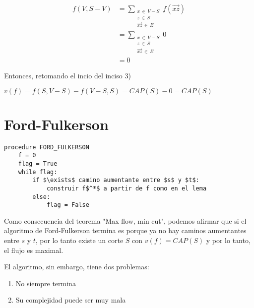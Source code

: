 \documentclass[10pt,a4paper]{article}
\begin{document}
\begin{center}
\begin{align*} f(V, S-V) &= \sum\limits_{\substack{x\,\in\,V -S\\ z \,\in\,S\\ \overrightarrow{xz} \,\in\,E}}f(\overrightarrow{xz})\\ &= \sum\limits_{\substack{x\,\in\,V -S\\ z \,\in\,S\\ \overrightarrow{xz} \,\in\,E}}0\\ &= 0 \end{align*}
\end{center}

Entonces, retomando el incio del inciso 3)

\begin{center}
$v(f) = f(S, V- S)-f(V-S, S) = CAP(S) - 0 = CAP(S)$
\end{center}

\section*{Ford-Fulkerson}


    \begin{lstlisting}[language=pseudo]
procedure FORD_FULKERSON
    f = 0
    flag = True
    while flag:
        if $\exists$ camino aumentante entre $s$ y $t$:
            construir f$^*$ a partir de f como en el lema
        else:
            flag = False
\end{lstlisting}


Como consecuencia del teorema "Max flow, min cut", podemos afirmar que si el algoritmo de Ford-Fulkerson termina es porque ya no hay caminos aumentantes entre $s$ y $t$, por lo tanto existe un corte $S$ con $v(f) = CAP(S)$ y por lo tanto, el flujo es maximal.

El algoritmo, sin embargo, tiene dos problemas:

\begin{enumerate}

	\item No siempre termina
	\item Su complejidad puede ser muy mala
\end{enumerate}
\end{document}
